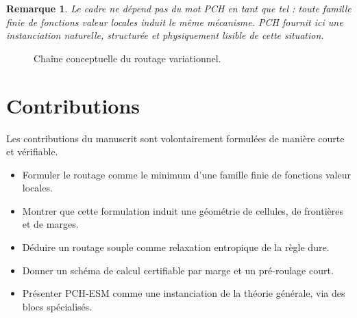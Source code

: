 \documentclass[11pt,a4paper]{article}
\newtheorem{remark}{Remarque}[section]
\DeclareMathOperator{\argmin}{argmin}
\newcommand{\Hh}{\mathcal H}
\newcommand{\Ccal}{\mathcal C}
\begin{document}
\begin{remark}
Le cadre ne dépend pas du mot PCH en tant que tel : toute famille finie de fonctions valeur locales induit le même mécanisme. PCH fournit ici une instanciation naturelle, structurée et physiquement lisible de cette situation.
\end{remark}

\begin{figure}[ht]
\centering
{}
\caption{Chaîne conceptuelle du routage variationnel.}
\end{figure}

\section{Contributions}

Les contributions du manuscrit sont volontairement formulées de manière courte et vérifiable.

\begin{itemize}[leftmargin=2em]
    \item Formuler le routage comme le minimum d'une famille finie de fonctions valeur locales.
    \item Montrer que cette formulation induit une géométrie de cellules, de frontières et de marges.
    \item Déduire un routage souple comme relaxation entropique de la règle dure.
    \item Donner un schéma de calcul certifiable par marge et un pré-roulage court.
    \item Présenter PCH-ESM comme une instanciation de la théorie générale, via des blocs spécialisés.
\end{itemize}
\end{document}
